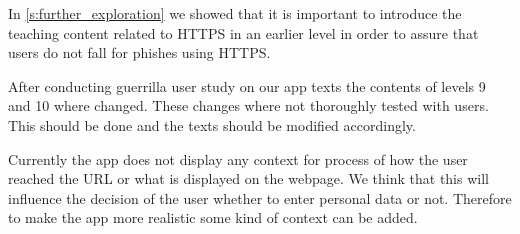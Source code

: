 \begin{description}[leftmargin=0cm]
	\item[HTTPS should be introduced earlier:] In \autoref{s:further_exploration} we showed that it is important to introduce the teaching content related to HTTPS in an earlier level in order to assure that users do not fall for phishes using HTTPS.
	\item[Text improvements:] After conducting guerrilla user study on our app texts the contents of levels 9 and 10 where changed. These changes where not thoroughly tested with users. This should be done and the texts should be modified accordingly. 
	\item[Add context:] Currently the app does not display any context for process of how the user reached the URL or what is displayed on the webpage. We think that this will influence the decision of the user whether to enter personal data or not. Therefore to make the app more realistic some kind of context can be added.
\end{description}

